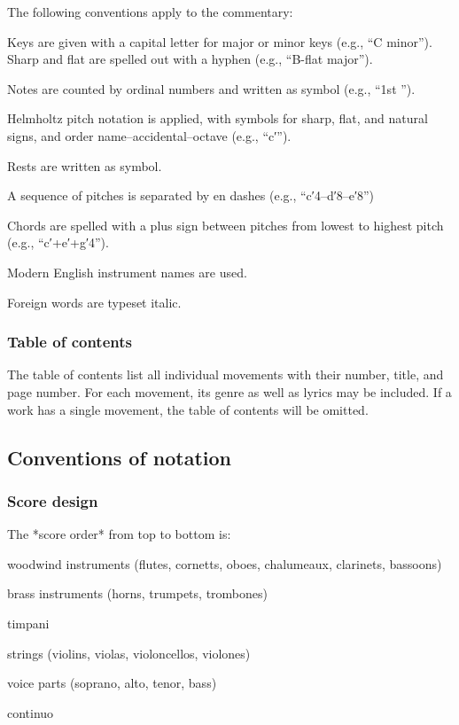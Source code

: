 \documentclass{ees}
\begin{document}
The following conventions apply to the commentary:
\begin{bulletlist}
  \item Keys are given with a capital letter for major or minor keys (e.g., “C minor”). Sharp and flat are spelled out with a hyphen (e.g., “B-flat major”).
  \item Notes are counted by ordinal numbers and written as symbol (e.g., “1st \quarterNote”).
  \item Helmholtz pitch notation is applied, with symbols for sharp, flat, and natural signs, and order name–accidental–octave (e.g., “\sharp c′”).
  \item Rests are written as symbol.
  \item A sequence of pitches is separated by en dashes (e.g., “c′4–d′8–e′8”)
  \item Chords are spelled with a plus sign between pitches from lowest to highest pitch (e.g., “c′+e′+g′4”).
  \item Modern English instrument names are used.
  \item Foreign words are typeset italic.
\end{bulletlist}


\subsubsection{Table of contents}

The table of contents list all individual movements with their number, title, and page number. For each movement, its genre as well as lyrics may be included. If a work has a single movement, the table of contents will be omitted.



\subsection{Conventions of notation}

\subsubsection{Score design}

The *score order* from top to bottom is:
\begin{bulletlist}
  \item woodwind instruments (flutes, cornetts, oboes, chalumeaux, clarinets, bassoons)
  \item brass instruments (horns, trumpets, trombones)
  \item timpani
  \item strings (violins, violas, violoncellos, violones)
  \item voice parts (soprano, alto, tenor, bass)
  \item continuo
\end{bulletlist}
\end{document}
